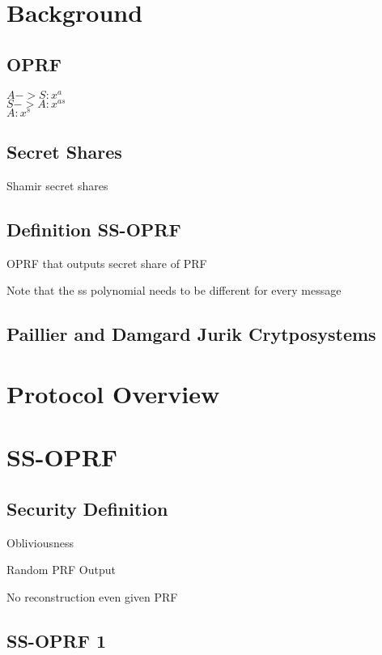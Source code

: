 \documentclass[10pt, sigconf]{acmart}
\begin{document}
\section{Background}

\subsection{OPRF}

$A -> S: x^a$ \\
$S -> A: x^{as}$ \\
$A: x^s$

\subsection{Secret Shares}

Shamir secret shares

\subsection{Definition SS-OPRF}

OPRF that outputs secret share of PRF

Note that the ss polynomial needs to be different for every message

\subsection{Paillier \cite{Paillier} and Damgard Jurik \cite{Damgard} Crytposystems}

\pagebreak
\section{Protocol Overview}


\pagebreak


\section{SS-OPRF}

\subsection{Security Definition}

Obliviousness

Random PRF Output

No reconstruction even given PRF

\subsection{SS-OPRF 1}
\end{document}
